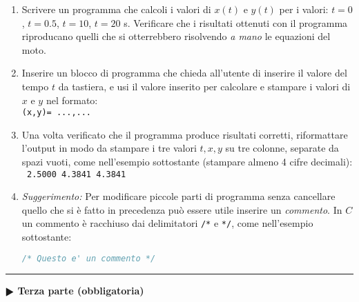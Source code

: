 \documentclass[11pt]{article}
\begin{document}
\begin{enumerate}
\item Scrivere un programma che calcoli i valori di $x(t)$ e $y(t)$ per i valori: $t=0$, $t=0.5$, $t=10$, $t=20$ s.
Verificare che i risultati ottenuti con il programma riproducano quelli che si otterrebbero risolvendo {\em a mano} le equazioni del moto.

\item Inserire un blocco di programma che chieda all'utente di inserire il valore del tempo $t$ da tastiera, e usi il valore inserito per calcolare e stampare i valori di $x$ e $y$ nel formato:
  \\
  \texttt{(x,y)= ...,...}
  
\item Una volta verificato che il programma produce risultati corretti, riformattare
  l'output in modo da stampare i tre valori $t,x,y$ su tre colonne, separate da spazi vuoti, come nell'esempio sottostante (stampare almeno 4 cifre decimali):
  \\
  \texttt{ 2.5000    4.3841    4.3841}


\item {\em Suggerimento:} Per modificare piccole parti di programma senza cancellare quello che
  si \`e fatto in precedenza pu\`o essere utile inserire un {\em commento}.
  In $C$ un commento \`e racchiuso dai delimitatori \texttt{/*} e  \texttt{*/}, come nell'esempio
  sottostante:
  \begin{lstlisting}[language=c,numbers=none]
  /* Questo e' un commento */
\end{lstlisting}
\end{enumerate}


\hrule
\vspace{1mm}
\textbf{$\RHD$ Terza parte (obbligatoria)} 
\end{document}
